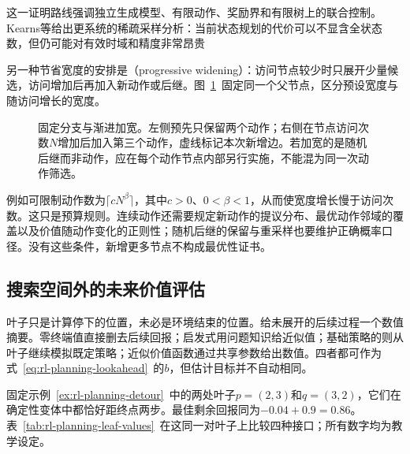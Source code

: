 这一证明路线强调独立生成模型、有限动作、奖励界和有限树上的联合控制。Kearns等给出更系统的稀疏采样分析：当前状态规划的代价可以不显含全状态数，但仍可能对有效时域和精度非常昂贵

另一种节省宽度的安排是（progressive widening）：访问节点较少时只展开少量候选，访问增加后再加入新动作或后继。图~\ref{fig:rl-planning-widening}~固定同一个父节点，区分预设宽度与随访问增长的宽度。

\begin{figure}[htbp]
 \centering
 
 \caption{固定分支与渐进加宽。左侧预先只保留两个动作；右侧在节点访问次数$N$增加后加入第三个动作，虚线标记本次新增边。若加宽的是随机后继而非动作，应在每个动作节点内部另行实施，不能混为同一次动作筛选。}
 \label{fig:rl-planning-widening}
\end{figure}

例如可限制动作数为$\lceil cN^\beta\rceil$，其中$c>0$、$0<\beta<1$，从而使宽度增长慢于访问次数。这只是预算规则。连续动作还需要规定新动作的提议分布、最优动作邻域的覆盖以及价值随动作变化的正则性；随机后继的保留与重采样也要维护正确概率口径。没有这些条件，新增更多节点不构成最优性证书。

\subsection{搜索空间外的未来价值评估}
\label{sec:rl-planning-leaf-value}

叶子只是计算停下的位置，未必是环境结束的位置。给未展开的后续过程一个数值摘要。零终端值直接删去后续回报；启发式用问题知识给近似值；基础策略的则从叶子继续模拟既定策略；近似价值函数通过共享参数给出数值。四者都可作为式~\eqref{eq:rl-planning-lookahead}~的$b$，但估计目标并不自动相同。

固定示例~\ref{ex:rl-planning-detour}~中的两处叶子$p=(2,3)$和$q=(3,2)$，它们在确定性变体中都恰好距终点两步。最佳剩余回报同为$-0.04+0.9=0.86$。表~\ref{tab:rl-planning-leaf-values}~在这同一对叶子上比较四种接口；所有数字均为教学设定。

